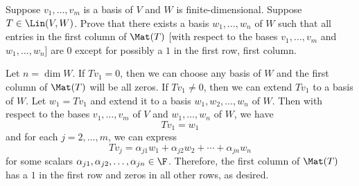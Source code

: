 \begin{exc}
\begin{exercise}
Suppose $v_1,\dots,v_m$ is a basis of $V$ and $W$ is finite-dimensional.
Suppose $T\in\Lin(V,W)$. Prove that there exists a basis $w_1,\dots,w_n$ of $W$
such that all entries in the first column of $\Mat(T)$ [with respect to the
bases $v_1,\dots,v_m$ and $w_1,\dots,w_n$] are $0$ except for possibly a $1$ in
the first row, first column.
\end{exercise}
\begin{solution}
Let $n=\dim W$. If $Tv_1=0$, then we can choose any basis of $W$ and the first
column of $\Mat(T)$ will be all zeros. If $Tv_1\ne0$, then we can extend $Tv_1$
to a basis of $W$. Let $w_1=Tv_1$ and extend it to a basis
$w_1,w_2,\dots,w_n$ of $W$. Then with respect to the bases $v_1,\dots,v_m$ of
$V$ and $w_1,\dots,w_n$ of $W$, we have
\[ Tv_1 = w_1 \]
and for each $j=2,\dots,m$, we can express
\[ Tv_j = \alpha_{j1}w_1+\alpha_{j2}w_2+\cdots+\alpha_{jn}w_n \]
for some scalars $\alpha_{j1},\alpha_{j2},\dots,\alpha_{jn}\in\F$. Therefore,
the first column of $\Mat(T)$ has a $1$ in the first row and zeros in all other
rows, as desired.
\end{solution}


\end{exc}
